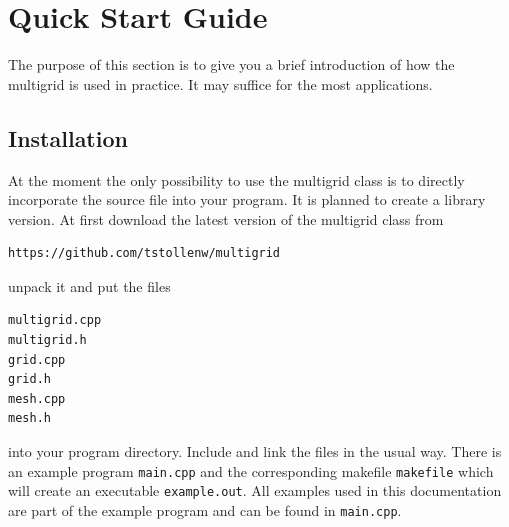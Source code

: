 \chapter{Quick Start Guide}\label{chapter:quick_start_guide}
The purpose of this section is to give you a brief introduction of how the multigrid is used in practice. It may suffice for the most applications.

\section{Installation}
At the moment the only possibility to use the multigrid class is to directly incorporate the source file into your program. It is planned to create a library version. At first download the latest version of the multigrid class from
\begin{lstlisting}[language=bash]
https://github.com/tstollenw/multigrid
\end{lstlisting}
unpack it and put the files
\begin{lstlisting}
multigrid.cpp
multigrid.h
grid.cpp
grid.h
mesh.cpp
mesh.h
\end{lstlisting}
into your program directory. Include and link the files in the usual way. There is an example program \texttt{main.cpp} and the corresponding makefile \texttt{makefile} which will create an executable \texttt{example.out}. All examples used in this documentation are part of the example program and can be found in \texttt{main.cpp}.


